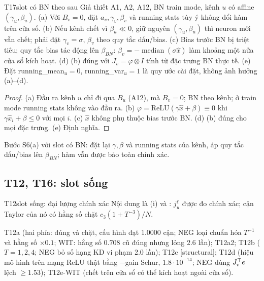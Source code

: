 \begin{namedthm}{T17}{slot có BN theo sau}
Giả thiết A1, A2, A12, BN train mode, kênh $u$ có affine $(\gamma_u,\beta_u)$.
(a) Với $B_v=0$, đặt $a_v,\gamma_v,\beta_v$ và running stats tùy ý không đổi hàm trên cửa sổ.
(b) Nếu kênh chết vì $\beta_u\ll0$, giữ nguyên $(\gamma_u,\beta_u)$ thì neuron mới vẫn chết; phải đặt $\gamma_v=\sigma$, $\beta_v$ theo quy tắc dấu/bias.
(c) Bias trước BN bị triệt tiêu; quy tắc bias tác động lên $\beta_{BN}$: $\beta_v=-\operatorname{median}(\sigma\hat x)$ làm khoảng một nửa cửa sổ kích hoạt.
(d) (b) đúng với $J_v=\varphi\otimes I$ tính từ đặc trưng BN thực tế.
(e) Đặt running\_mean$_u=0$, running\_var$_u=1$ là quy ước cài đặt, không ảnh hưởng (a)--(d).
\end{namedthm}
\begin{proof}
(a) Đầu ra kênh $u$ chỉ đi qua $B_u$ (A12), mà $B_v=0$; BN theo kênh; ở train mode running stats không vào đầu ra. (b) $\varphi=\mathrm{ReLU}(\gamma\hat x+\beta)\equiv0$ khi $\gamma\hat x_i+\beta\le0$ với mọi $i$. (c) $\hat x$ không phụ thuộc bias trước BN. (d) (b) đúng cho mọi đặc trưng. (e) Định nghĩa.
\end{proof}
\begin{hequa}
Bước S6(a) với slot có BN: đặt lại $\gamma,\beta$ và running stats của kênh, áp quy tắc dấu/bias lên $\beta_{BN}$; hàm vẫn được bảo toàn chính xác.
\end{hequa}

\subsection{T12, T16: slot sống}

\begin{namedthm}{T12}{slot sống: đại lượng chính xác}
Nội dung là (i) và : $j_u^\ell$ được đo chính xác; cận Taylor của nó có hằng số chặt $c_3(1+T^{-3})/N$.
\end{namedthm}
\begin{kiem}
T12a (hai phía: đúng và chặt, cấu hình đạt $1.0000$ cận; NEG loại chuẩn hóa $T^{-1}$ và hằng số ${\times}0.1$; WIT: hằng số $0.708$ cũ đúng nhưng lỏng 2.6 lần); T12a2; T12b ($T=1,2,4$; NEG bỏ số hạng KD vi phạm 2.0 lần); T12c [structural]; T12d (hiệu mô hình trên mạng ReLU thật bằng $-$gain Schur, $1.8\cdot10^{-14}$; NEG dùng $J_v^{\top} e$ lệch $\ge1.53$); T12e-WIT (chết trên cửa sổ có thể kích hoạt ngoài cửa sổ).
\end{kiem}

